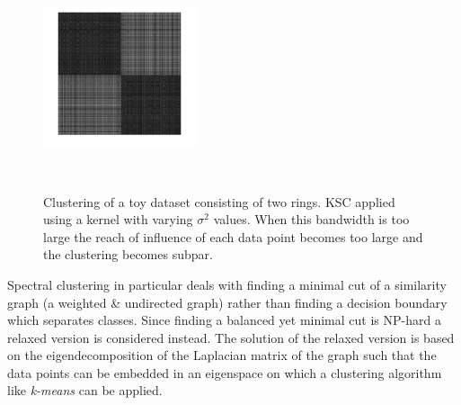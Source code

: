 \begin{figure}[h]
{\begin{minipage}{0.48\textwidth}
\includegraphics[width=0.4\textwidth]{../src/figures/spectral/rings_block_1000}
\end{minipage}}\\
%
\caption{Clustering of a toy dataset consisting of two rings. KSC applied using a kernel with varying $\sigma^2$ values. When this bandwidth is too large the reach of influence of each data point becomes too large and the clustering becomes subpar.}
\label{spectraltoy}
\end{figure}

\par Spectral clustering in particular deals with finding a minimal cut of a similarity graph (a weighted \& undirected graph) rather than finding a decision boundary which separates classes. Since finding a balanced yet minimal cut is NP-hard a relaxed version is considered instead. The solution of the relaxed version is based on the eigendecomposition of the Laplacian matrix of the graph such that the data points can be embedded in an eigenspace on which a clustering algorithm like \textit{k-means} can be applied. 

